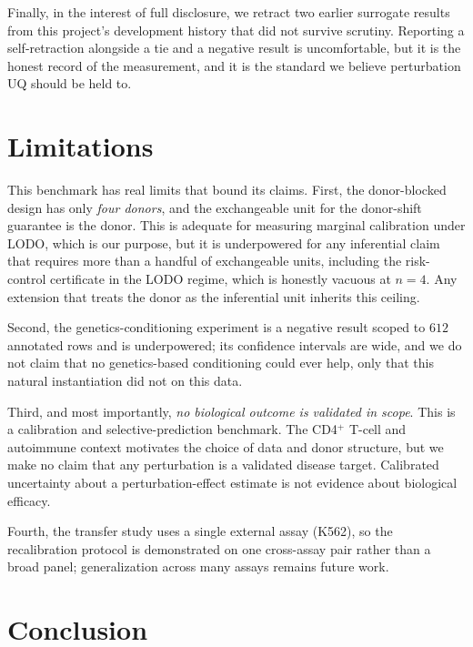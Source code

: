 \documentclass{article}
\begin{document}
Finally, in the interest of full disclosure, we retract two earlier
surrogate results from this project's development history that did not
survive scrutiny. Reporting a self-retraction alongside a tie and a
negative result is uncomfortable, but it is the honest record of the
measurement, and it is the standard we believe perturbation UQ should be
held to.

\section{Limitations}

This benchmark has real limits that bound its claims. First, the
donor-blocked design has only \emph{four donors}, and the
exchangeable unit for the donor-shift guarantee is the donor. This is
adequate for measuring marginal calibration under LODO, which is our
purpose, but it is underpowered for any inferential claim that requires
more than a handful of exchangeable units, including the risk-control
certificate in the LODO regime, which is honestly vacuous at $n{=}4$. Any
extension that treats the donor as the inferential unit inherits this
ceiling.

Second, the genetics-conditioning experiment is a negative result scoped
to $612$ annotated rows and is underpowered; its confidence intervals are
wide, and we do not claim that no genetics-based conditioning could ever
help, only that this natural instantiation did not on this data.

Third, and most importantly, \emph{no biological outcome is validated in
scope}. This is a calibration and selective-prediction benchmark. The
CD4$^{+}$ T-cell and autoimmune context motivates the choice of data and
donor structure, but we make no claim that any perturbation is a
validated disease target. Calibrated uncertainty about a
perturbation-effect estimate is not evidence about biological efficacy.

Fourth, the transfer study uses a single external assay (K562), so the
recalibration protocol is demonstrated on one cross-assay pair rather
than a broad panel; generalization across many assays remains future
work.

\section{Conclusion}
\end{document}
